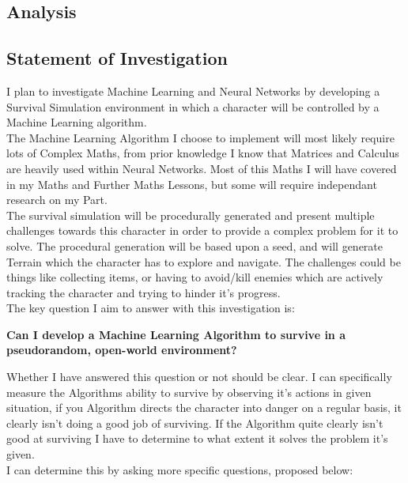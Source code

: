 \begin{flushleft}
    \section{Analysis}
        \subsection{Statement of Investigation}
            \large
            \vspace{0.2cm}
            I plan to investigate Machine Learning and Neural Networks by developing a Survival Simulation environment 
            in which a character will be controlled by a Machine Learning algorithm. \\
            \vspace{0.2cm}
            The Machine Learning Algorithm I choose to implement will most likely require lots of Complex Maths, from prior knowledge
            I know that Matrices and Calculus are heavily used within Neural Networks. Most of this Maths I will have 
            covered in my Maths and Further Maths Lessons, but some will require independant research on my Part. \\
            \vspace{0.2cm}
            The survival simulation will be procedurally generated and present multiple challenges 
            towards this character in order to provide a complex problem for it to solve. The procedural generation will
            be based upon a seed, and will generate Terrain which the character has to explore and navigate. The challenges 
            could be things like collecting items, or having to avoid/kill enemies which are actively tracking the character 
            and trying to hinder it's progress. \\
            \vspace{0.2cm}
            The key question I aim to answer with this investigation is:

            \begin{center}
                \vspace{0.3cm}
                \textbf{Can I develop a Machine Learning Algorithm to survive in a pseudorandom, open-world environment?}
                \vspace{0.3cm}
            \end{center}

            Whether I have answered this question or not should be clear. I can specifically measure the Algorithms ability 
            to survive by observing it's actions in given situation, if you Algorithm directs the character into danger
            on a regular basis, it clearly isn't doing a good job of surviving. If the Algorithm quite clearly isn't good
            at surviving I have to determine to what extent it solves the problem it's given. \\
            \vspace{0.2cm}
            I can determine this by asking more specific questions, proposed below: \\


\end{flushleft}
